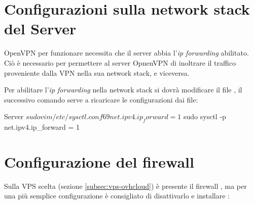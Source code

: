 \section{Configurazioni sulla network stack del Server \ok}
\label{sec:network_stack}

OpenVPN per funzionare necessita che il server abbia l'\textit{ip forwarding} abilitato. Ciò è necessario per permettere al server OpnenVPN di inoltrare il traffico proveniente dalla VPN nella sua network stack, e viceversa.

Per abilitare l'\textit{ip forwarding} nella network stack si dovrà modificare il file , il successivo comando serve a ricaricare le configurazioni dai file:

\begin{bashcode}{Server}{}
$ sudo vim /etc/sysctl.conf
69 net.ipv4.ip_forward = 1
$ sudo sysctl -p
net.ipv4.ip_forward = 1
\end{bashcode}

\section{Configurazione del firewall}
\label{sec:firewall}

Sulla VPS scelta (sezione \ref{subsec:vps-ovhcloud}) è presente il firewall , ma per una più semplice configurazione è consigliato di disattivarlo e installare :



